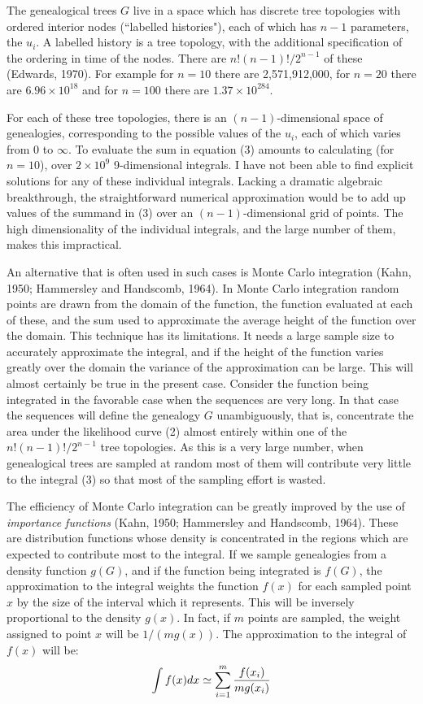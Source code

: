 The genealogical trees $G$ live in a space which has discrete tree
topologies with ordered interior nodes (``labelled histories"), each of which
has $n-1$ parameters, the $u_i$.  A labelled history is a tree topology, with
the additional specification of the ordering in time of the nodes. There are
$n! (n-1)! / 2^{n-1}$ of these (Edwards, 1970).  For example for $n=10$ there
are 2,571,912,000, for $n=20$ there are $6.96 \times 10^{18}$ and for
$n=100$ there are $1.37 \times 10^{284}$.

For each of these tree topologies, there is an $(n-1)$-dimensional space
of genealogies, corresponding to the possible values of the $u_i$, each
of which varies from 0 to $\infty$.  To evaluate the sum in equation (3)
amounts to calculating (for $n=10$), over $2 \times 10^9$ 9-dimensional
integrals.  I have not been able to find explicit solutions for any of
these individual integrals.  Lacking a dramatic algebraic breakthrough,
the straightforward numerical approximation would be to add up values of the
summand in (3) over an $(n-1)$-dimensional grid of points.  The high
dimensionality of the individual integrals, and the large number of them,
makes this impractical.

An alternative that is often used in such cases is Monte Carlo integration
(Kahn, 1950; Hammersley and Handscomb, 1964).
In Monte Carlo integration random points are drawn from the domain of the
function, the function evaluated at each of these, and the sum used to
approximate the average height of the function over the domain.  This
technique has its limitations.  It needs a large sample size to accurately
approximate the integral, and if the height of the function varies greatly
over the domain the variance of the approximation can be large.  This will
almost certainly be true in the present case.  Consider the function being
integrated in the favorable case when the sequences are very long.  In that
case the sequences will define the genealogy $G$ unambiguously, that is,
concentrate the area under the likelihood curve (2) almost entirely within
one of the $n!(n-1)!/2^{n-1}$ tree topologies.  As this is a very large number,
when genealogical trees are sampled at random most of them will contribute
very little to the integral (3) so that most of the sampling effort is wasted.

The efficiency of Monte Carlo integration can be greatly improved by the use
of {\it importance functions} (Kahn, 1950; Hammersley and Handscomb, 1964).
These are distribution functions whose
density is concentrated in the regions which are expected to contribute 
most to the integral.  If we sample genealogies from a density function
$g(G)$, and if the function being integrated is $f(G)$, the approximation to
the integral weights the function $f(x)$ for each sampled point $x$ by the
size of the interval which it represents.  This will be inversely proportional
to the density $g(x)$.  In fact, if $m$ points are sampled, the weight assigned to point
$x$ will be $1/(mg(x))$.  The approximation to the integral of $f(x)$ will be:
\begin{equation} %
\int f(x) dx \simeq  \sum_{i=1}^m {f(x_i) \over mg(x_i)}
\end{equation}

